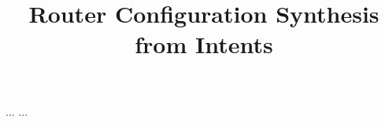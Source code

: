 \documentclass[10pt,numbers,preprint,nocopyrightspace]{sigplanconf}
\newif\iffull
\begin{document}
%



\title{Router Configuration Synthesis from Intents}

{...}
{...}

\maketitle











%
%


%





\iffull

\fi
\end{document}
